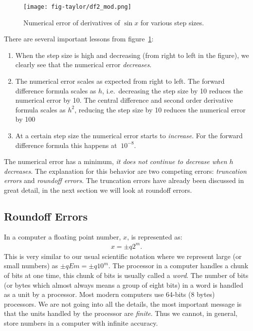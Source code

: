 \documentclass[graybox,sectrefs,envcountresetchap,open=right,final]{svmonodo}
\begin{document}
\begin{figure}[!ht]  %
  \centerline{\texttt{[image: fig-taylor/df2\_mod.png]}}
  \caption{
  Numerical error of derivatives of $\sin x$ for various step sizes. \label{fig:taylor:df2}
  }
\end{figure}

There are several important lessons from figure~\ref{fig:taylor:df2}:
\begin{enumerate}
\item When the step size is high and decreasing (from right to left in the figure), we clearly see that the numerical error \emph{decreases}.

\item The numerical error scales as expected from right to left. The forward difference formula scales as $h$, i.e.~decreasing the step size by 10 reduces the numerical error by 10. The central difference and second order derivative formula scales as $h^2$, reducing the step size by 10 reduces the numerical error by 100

\item At a certain step size the numerical error starts to \emph{increase}. For the forward difference formula this happens at $~10^{-8}$.
\end{enumerate}

\noindent
The numerical error has a minimum, \emph{it does not continue to decrease when $h$ decreases}. The explanation for this behavior are two competing errors: \emph{truncation errors} and \emph{roundoff errors}. The truncation errors have already been discussed in great detail, in the next section we will look at roundoff errors.

\subsection{Roundoff Errors}
In a computer a floating point number, $x$, is represented as:
\begin{align}
x=\pm q2^m.
\label{eq:taylor:sci2}
\end{align}
This is very similar to our usual scientific notation where we represent large (or small numbers) as $\pm q E m=\pm q 10^{m}$. The processor in a computer handles a chunk of bits at one time, this chunk of bits is usually called a \emph{word}. The number of bits (or bytes which almost always means a group of eight bits) in a word is handled as a unit by a processor.   
Most modern computers use 64-bits (8 bytes) processors. We are not going into all the details, the most important message is that the units handled by the processor are \emph{finite}. Thus we cannot, in general, store numbers in a computer with infinite accuracy.
\end{document}
